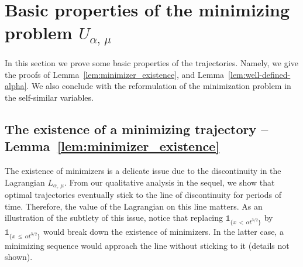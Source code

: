\documentclass[AHL,Unicode,longabstracts]{cedram}
\newcommand{\1}{\mathds{1}}
\begin{document}
\section{Basic properties of the minimizing problem \texorpdfstring{$U_{\alpha,\,\mu}$}{U alpha, mu}}\label{sec:basic_trajectories}

In this section we prove some basic properties of the trajectories. Namely, we give the proofs of Lemma~\ref{lem:minimizer_existence}, and Lemma~\ref{lem:well-defined-alpha}. We also conclude with the reformulation of the minimization problem in the self-similar variables.



\subsection{The existence of a minimizing trajectory -- Lemma~\ref{lem:minimizer_existence}}\label{sec:41}

The existence of minimizers is a delicate issue due to the discontinuity in the Lagrangian $L_{\alpha,\,\mu}$. From our qualitative analysis in the sequel, we show that optimal trajectories eventually stick to the line of discontinuity for periods of time. Therefore, the value of the Lagrangian on this line matters. As an illustration of the subtlety of this issue, notice that replacing $\1_{\{ x\,<\,\alpha t^{3/2}\}} $ by $\1_{\{ x\,\leq\,\alpha t^{3/2}\}}$ would break down the existence of minimizers. In the latter case, a minimizing sequence would approach the line without sticking to it (details not shown).
\end{document}
